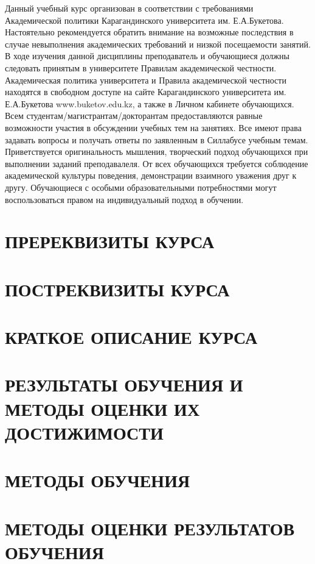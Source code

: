 Данный учебный курс организован в соответствии с требованиями Академической политики Карагандинского университета им. Е.А.Букетова. Настоятельно рекомендуется обратить внимание на возможные последствия в случае невыполнения академических требований и низкой посещаемости занятий. В ходе изучения данной дисциплины преподаватель и обучающиеся должны следовать принятым в университете Правилам академической честности. Академическая политика университета и Правила академической честности  находятся в свободном доступе на сайте Карагандинского университета им. Е.А.Букетова www.buketov.edu.kz, а также в Личном кабинете обучающихся. Всем студентам/магистрантам/докторантам предоставляются равные возможности участия в обсуждении учебных тем на занятиях. Все имеют права задавать вопросы и получать ответы по заявленным в Силлабусе учебным темам. Приветствуется оригинальность мышления, творческий подход обучающихся при выполнении заданий преподавалеля. От всех обучающихся требуется соблюдение академической культуры поведения, демонстрации взаимного уважения друг к другу. Обучающиеся с особыми образовательными потребностями могут воспользоваться правом на индивидуальный подход в обучении.

\section{ПРЕРЕКВИЗИТЫ КУРСА}
\justifying
\prerequisites

\section{ПОСТРЕКВИЗИТЫ КУРСА}
\justifying
\postRequisites

\section{КРАТКОЕ ОПИСАНИЕ КУРСА}
\justifying
\courseDescription

\section{РЕЗУЛЬТАТЫ ОБУЧЕНИЯ И МЕТОДЫ ОЦЕНКИ ИХ ДОСТИЖИМОСТИ}
\losAndMethodsTable

\section{МЕТОДЫ ОБУЧЕНИЯ}
\justifying
\teachingMethods

\section{МЕТОДЫ ОЦЕНКИ РЕЗУЛЬТАТОВ ОБУЧЕНИЯ}
\justifying
\gradeMethods

